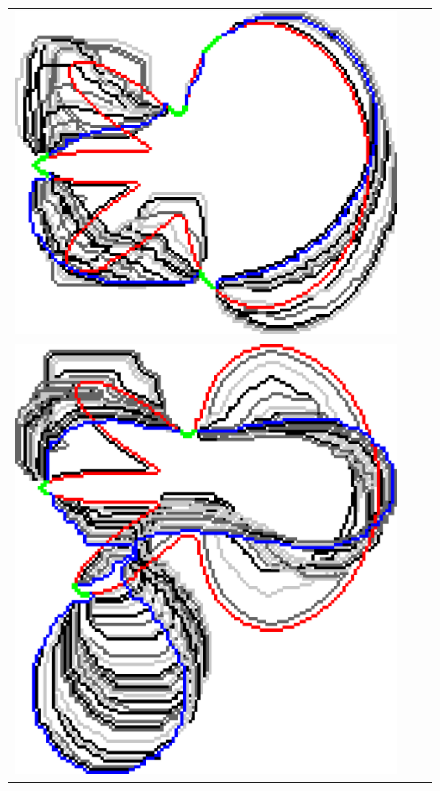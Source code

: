\begin{figure}[]
\begin{tabular}{ccc}
\includegraphics[scale=0.25]{figures/chapter5/fixed-pixels/selastica/len_pen_0.01/flower-1/summary.pdf}\\[2em]
\includegraphics[scale=0.25]{figures/chapter5/fixed-pixels/selastica/len_pen_0.01/flower-2/summary.pdf} &

\end{tabular}
\end{figure}
